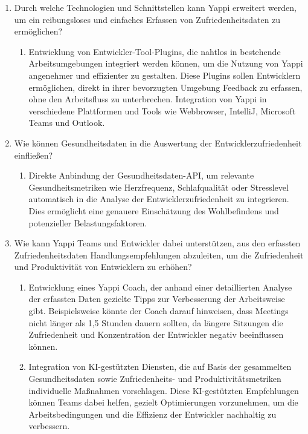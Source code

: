 \documentclass[12pt,a4paper]{report}
\begin{document}
\begin{enumerate}[label=\Alph*.] %
    \item Durch welche Technologien und Schnittstellen kann Yappi erweitert werden, 
    um ein reibungsloses und einfaches Erfassen von Zufriedenheitsdaten zu ermöglichen?
    \begin{enumerate}[label=\alph*.] %
        \item Entwicklung von Entwickler-Tool-Plugins, die nahtlos in bestehende Arbeitsumgebungen 
        integriert werden können, um die Nutzung von Yappi angenehmer und effizienter zu gestalten. 
        Diese Plugins sollen Entwicklern ermöglichen, direkt in ihrer bevorzugten Umgebung Feedback 
        zu erfassen, ohne den Arbeitsfluss zu unterbrechen. Integration von Yappi in verschiedene 
        Plattformen und Tools wie Webbrowser, IntelliJ, Microsoft Teams und Outlook.
    \end{enumerate}
    \item Wie können Gesundheitsdaten in die Auswertung der Entwicklerzufriedenheit einfließen?
    \begin{enumerate}[label=\alph*.]
        \item Direkte Anbindung der Gesundheitsdaten-API, um relevante Gesundheitsmetriken wie 
        Herzfrequenz, Schlafqualität oder Stresslevel automatisch in die Analyse der 
        Entwicklerzufriedenheit zu integrieren. Dies ermöglicht eine genauere Einschätzung des 
        Wohlbefindens und potenzieller Belastungsfaktoren.
    \end{enumerate}
    \item Wie kann Yappi Teams und Entwickler dabei unterstützen, aus den erfassten 
    Zufriedenheitsdaten Handlungsempfehlungen abzuleiten, um die Zufriedenheit und Produktivität 
    von Entwicklern zu erhöhen?
    \begin{enumerate}[label=\alph*.]
        \item Entwicklung eines Yappi Coach, der anhand einer detaillierten Analyse der erfassten 
        Daten gezielte Tipps zur Verbesserung der Arbeitsweise gibt. Beispielsweise könnte der Coach 
        darauf hinweisen, dass Meetings nicht länger als 1,5 Stunden dauern sollten, da längere 
        Sitzungen die Zufriedenheit und Konzentration der Entwickler negativ beeinflussen können.
        \item Integration von KI-gestützten Diensten, die auf Basis der gesammelten Gesundheitsdaten 
        sowie Zufriedenheits- und Produktivitätsmetriken individuelle Maßnahmen vorschlagen. Diese 
        KI-gestützten Empfehlungen können Teams dabei helfen, gezielt Optimierungen vorzunehmen, um 
        die Arbeitsbedingungen und die Effizienz der Entwickler nachhaltig zu verbessern.
    \end{enumerate}
\end{enumerate}
\end{document}
